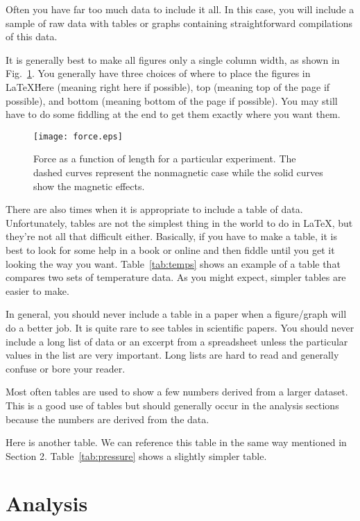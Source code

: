 \documentclass[preprint,pre,floats,aps,amsmath,amssymb]{revtex4}
\begin{document}
Often you have far too much data to include it all.  In this case, you
will include a sample of raw data with tables or graphs containing
straightforward compilations of this data. 

It is generally best to make all figures only a single column width,
as shown in Fig.~\ref{fig:force}.  You generally have three choices of
where to place the figures in \LaTeX\.  Here (meaning right here if
possible), top (meaning top of the page if possible), and bottom
(meaning bottom of the page if possible). You may still have to do
some fiddling at the end to get them exactly where you want them.

\begin{figure}[ht]
\texttt{[image: force.eps]}
\caption{Force as a function of length for a particular experiment.
The dashed curves represent the nonmagnetic case while the solid
curves show the magnetic effects.}
\label{fig:force}
\end{figure}

There are also times when it is appropriate to include a table of
data.  Unfortunately, tables are not the simplest thing in the world
to do in \LaTeX, but they're not all that difficult either. 
Basically, if you have to make a table, it is best to look for some
help in a book or online and then fiddle until you get it looking the
way you want. Table~\ref{tab:temps} shows an example of a table that
compares two sets of temperature data. As you might expect, simpler
tables are easier to make.


In general, you should never include a table in a paper when a
figure/graph will do a better job.  It is quite rare to see tables in
scientific papers.  You should never include a long list of data or an
excerpt from a spreadsheet unless the particular values in the list
are very important.  Long lists are hard to read and generally confuse
or bore your reader.  

Most often tables are used to show a few numbers derived from a larger
dataset.  This is a good use of tables but should generally occur in
the analysis sections because the numbers are derived from the data.

Here is another table. We can reference this table in the same way
mentioned in Section 2. Table~\ref{tab:pressure} shows a slightly
simpler table.  



\section{Analysis}
\label{sec:analysis}
\end{document}

